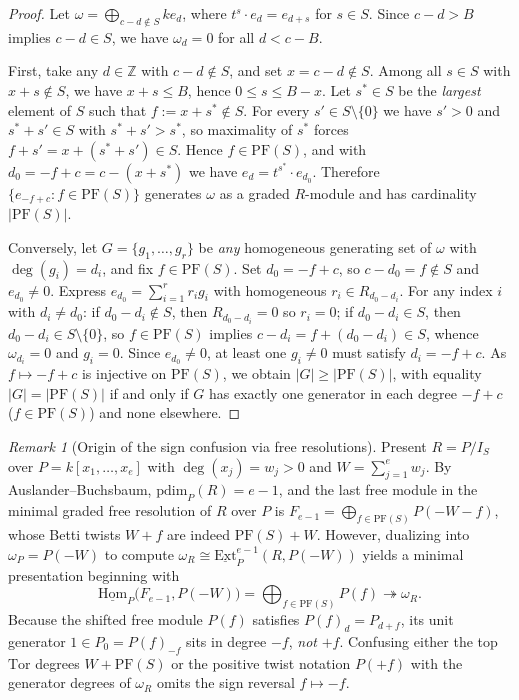 \documentclass[11pt]{article}
\theoremstyle{definition}
\theoremstyle{remark}
\newtheorem{remark}[theorem]{Remark}
\begin{document}
\begin{proof}
Let $\omega = \bigoplus_{c - d \notin S} k e_d$, where $t^s \cdot e_d = e_{d+s}$ for $s \in S$. Since $c - d > B$ implies $c - d \in S$, we have $\omega_d = 0$ for all $d < c - B$.

First, take any $d \in \mathbb{Z}$ with $c - d \notin S$, and set $x = c - d \notin S$. Among all $s \in S$ with $x + s \notin S$, we have $x + s \le B$, hence $0 \le s \le B - x$. Let $s^* \in S$ be the \emph{largest} element of $S$ such that $f := x + s^* \notin S$. For every $s' \in S \setminus \{0\}$ we have $s' > 0$ and $s^* + s' \in S$ with $s^* + s' > s^*$, so maximality of $s^*$ forces $f + s' = x + (s^* + s') \in S$. Hence $f \in \mathrm{PF}(S)$, and with $d_0 = -f + c = c - (x + s^*)$ we have $e_d = t^{s^*} \cdot e_{d_0}$. Therefore $\{ e_{-f + c} : f \in \mathrm{PF}(S) \}$ generates $\omega$ as a graded $R$-module and has cardinality $|\mathrm{PF}(S)|$.

Conversely, let $G = \{g_1, \dots, g_r\}$ be \emph{any} homogeneous generating set of $\omega$ with $\deg(g_i) = d_i$, and fix $f \in \mathrm{PF}(S)$. Set $d_0 = -f + c$, so $c - d_0 = f \notin S$ and $e_{d_0} \ne 0$. Express $e_{d_0} = \sum_{i=1}^r r_i g_i$ with homogeneous $r_i \in R_{d_0 - d_i}$. For any index $i$ with $d_i \ne d_0$: if $d_0 - d_i \notin S$, then $R_{d_0 - d_i} = 0$ so $r_i = 0$; if $d_0 - d_i \in S$, then $d_0 - d_i \in S \setminus \{0\}$, so $f \in \mathrm{PF}(S)$ implies $c - d_i = f + (d_0 - d_i) \in S$, whence $\omega_{d_i} = 0$ and $g_i = 0$. Since $e_{d_0} \ne 0$, at least one $g_i \ne 0$ must satisfy $d_i = -f + c$. As $f \mapsto -f + c$ is injective on $\mathrm{PF}(S)$, we obtain $|G| \ge |\mathrm{PF}(S)|$, with equality $|G| = |\mathrm{PF}(S)|$ if and only if $G$ has exactly one generator in each degree $-f + c$ ($f \in \mathrm{PF}(S)$) and none elsewhere.
\end{proof}

\begin{remark}[Origin of the sign confusion via free resolutions]\label{rem:syzygy-twist}
Present $R = P/I_S$ over $P = k[x_1, \dots, x_e]$ with $\deg(x_j) = w_j > 0$ and $W = \sum_{j=1}^e w_j$. By Auslander--Buchsbaum, $\mathrm{pdim}_P(R) = e - 1$, and the last free module in the minimal graded free resolution of $R$ over $P$ is $F_{e-1} = \bigoplus_{f \in \mathrm{PF}(S)} P(-W - f)$, whose Betti twists $W + f$ are indeed $\mathrm{PF}(S) + W$. However, dualizing into $\omega_P = P(-W)$ to compute $\omega_R \cong \underline{\mathrm{Ext}}^{e-1}_P(R, P(-W))$ yields a minimal presentation beginning with
\[
  \underline{\mathrm{Hom}}_P\bigl(F_{e-1}, P(-W)\bigr) = \bigoplus_{f \in \mathrm{PF}(S)} P(f) \twoheadrightarrow \omega_R.
\]
Because the shifted free module $P(f)$ satisfies $P(f)_d = P_{d + f}$, its unit generator $1 \in P_0 = P(f)_{-f}$ sits in degree $-f$, \emph{not} $+f$. Confusing either the top $\mathrm{Tor}$ degrees $W + \mathrm{PF}(S)$ or the positive twist notation $P(+f)$ with the generator degrees of $\omega_R$ omits the sign reversal $f \mapsto -f$.
\end{remark}
\end{document}
